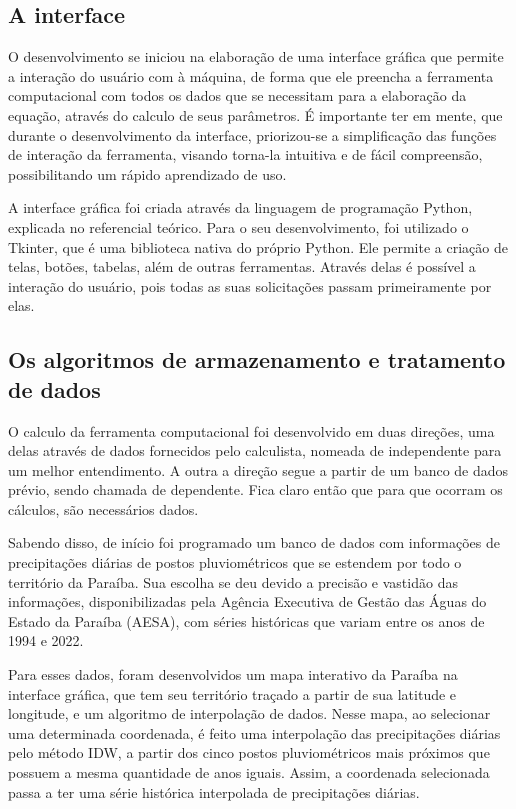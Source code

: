 \subsection{A interface}

O desenvolvimento se iniciou na elaboração de uma interface gráfica que permite a interação do usuário com à máquina, de forma que ele preencha a ferramenta computacional com todos os dados que se necessitam para a elaboração da equação, através do calculo de seus parâmetros. É importante ter em mente, que durante o desenvolvimento da interface, priorizou-se a simplificação das funções de interação da ferramenta, visando torna-la intuitiva e de fácil compreensão, possibilitando um rápido aprendizado de uso.

A interface gráfica foi criada através da linguagem de programação Python, explicada no referencial teórico. Para o seu desenvolvimento, foi utilizado o Tkinter, que é uma biblioteca nativa do próprio Python. Ele permite a criação de telas, botões, tabelas, além de outras ferramentas. Através delas é possível a interação do usuário, pois todas as suas solicitações passam primeiramente por elas.

\subsection{Os algoritmos de armazenamento e tratamento de dados}

O calculo da ferramenta computacional foi desenvolvido em duas direções, uma delas através de dados fornecidos pelo calculista, nomeada de independente para um melhor entendimento. A outra a direção segue a partir de um banco de dados prévio, sendo chamada de dependente. Fica claro então que para que ocorram os cálculos, são necessários dados.

Sabendo disso, de início foi programado um banco de dados com informações de precipitações diárias de postos pluviométricos que se estendem por todo o território da Paraíba. Sua escolha se deu devido a precisão e vastidão das informações, disponibilizadas pela Agência Executiva de Gestão das Águas do Estado da Paraíba (AESA), com séries históricas que variam entre os anos de 1994 e 2022.

Para esses dados, foram desenvolvidos um mapa interativo da Paraíba na interface gráfica, que tem seu território traçado a partir de sua latitude e longitude, e um algoritmo de interpolação de dados. Nesse mapa, ao selecionar uma determinada coordenada, é feito uma interpolação das precipitações diárias pelo método IDW, a partir dos cinco postos pluviométricos mais próximos que possuem a mesma quantidade de anos iguais. Assim, a coordenada selecionada passa a ter uma série histórica interpolada de precipitações diárias. 

